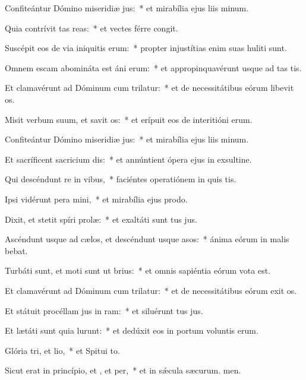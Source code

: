 \item Confiteántur Dómino miseridiæ jus:~* et mirabília ejus liis minum.
\item Quia contrívit tas reas:~* et vectes férre congit.
\item Suscépit eos de via iniquitis erum:~* propter injustítias enim suas huliti sunt.
\item Omnem escam abomináta est áni erum:~* et appropinquavérunt usque ad tas tis.
\item Et clamavérunt ad Dóminum cum trilatur:~* et de necessitátibus eórum libevit os.
\item Misit verbum suum, et savit os:~* et erípuit eos de interitióni erum.
\item Confiteántur Dómino miseridiæ jus:~* et mirabília ejus liis minum.
\item Et sacríficent sacricium dis:~* et annúntient ópera ejus in exsultine.
\item Qui descéndunt re in vibus,~* faciéntes operatiónem in quis tis.
\item Ipsi vidérunt pera mini,~* et mirabília ejus  prodo.
\item Dixit, et stetit spíri prolæ:~* et exaltáti sunt tus jus.
\item Ascéndunt usque ad cælos, et descéndunt usque  asos:~* ánima eórum in malis bebat.
\item Turbáti sunt, et moti sunt ut brius:~* et omnis sapiéntia eórum vota est.
\item Et clamavérunt ad Dóminum cum trilatur:~* et de necessitátibus eórum exit os.
\item Et státuit procéllam jus in ram:~* et siluérunt tus jus.
\item Et lætáti sunt quia lurunt:~* et dedúxit eos in portum voluntis erum.
\item Glória tri, et lio,~* et Spitui to.
\item Sicut erat in princípio, et , et per,~* et in sǽcula sæcurum. men.
